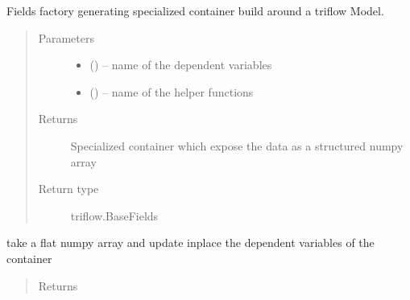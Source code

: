 \documentclass[letterpaper,10pt,english]{sphinxmanual}
\begin{document}
\begin{fulllineitems}

\begin{fulllineitems}
\label{\detokenize{triflow.core:triflow.core.fields.BaseFields.copy}}
\end{fulllineitems}


\begin{fulllineitems}
\label{\detokenize{triflow.core:triflow.core.fields.BaseFields.factory}}
Fields factory generating specialized container build around a
triflow Model.
\begin{quote}\begin{description}
\item[{Parameters}] \leavevmode\begin{itemize}
\item {} 
 () -- name of the dependent variables

\item {} 
 () -- name of the helper functions

\end{itemize}

\item[{Returns}] \leavevmode
Specialized container which expose the data as a structured numpy array

\item[{Return type}] \leavevmode
triflow.BaseFields

\end{description}\end{quote}

\end{fulllineitems}


\begin{fulllineitems}
\label{\detokenize{triflow.core:triflow.core.fields.BaseFields.fill}}
take a flat numpy array and update inplace the dependent
variables of the container
\begin{quote}\begin{description}
\item[{Returns}] \leavevmode



\end{description}
\end{quote}
\end{fulllineitems}
\end{fulllineitems}
\end{document}
